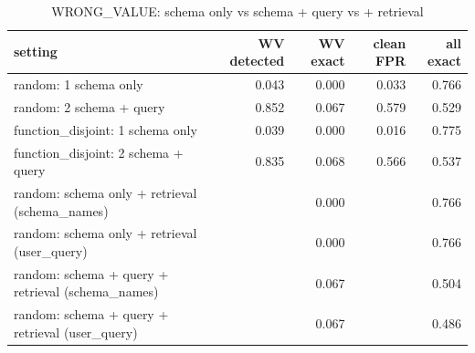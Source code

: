 \begin{table}[t]
\centering
\caption{WRONG_VALUE: schema only vs schema + query vs + retrieval}
\label{tab:wrong_value_settings}
\begin{tabular}{lrrrr}
\hline
setting & WV detected & WV exact & clean FPR & all exact \\
\hline
random: 1 schema only & 0.043 & 0.000 & 0.033 & 0.766 \\
random: 2 schema + query & 0.852 & 0.067 & 0.579 & 0.529 \\
function\_disjoint: 1 schema only & 0.039 & 0.000 & 0.016 & 0.775 \\
function\_disjoint: 2 schema + query & 0.835 & 0.068 & 0.566 & 0.537 \\
random: schema only + retrieval (schema\_names) &  & 0.000 &  & 0.766 \\
random: schema only + retrieval (user\_query) &  & 0.000 &  & 0.766 \\
random: schema + query + retrieval (schema\_names) &  & 0.067 &  & 0.504 \\
random: schema + query + retrieval (user\_query) &  & 0.067 &  & 0.486 \\
\hline
\end{tabular}
\end{table}
